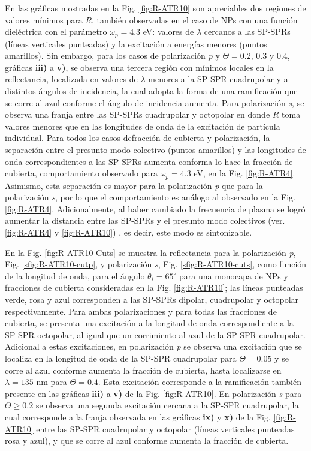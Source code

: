 	
En las gráficas mostradas en la Fig. \ref{fig:R-ATR10} son apreciables dos regiones de valores mínimos para $R$, también observadas en el caso de NPs con una función dieléctrica con el parámetro $\omega_p=4.3$ eV: valores de $\lambda$ cercanos a las SP-SPRs (líneas verticales punteadas) y la excitación a energías menores (puntos amarillos). Sin embargo, para los casos de polarización \emph{p} y $\Theta = 0.2,\,0.3$ y $0.4$, gráficas \textbf{iii)} a \textbf{v)}, se observa una tercera región con mínimos locales en la reflectancia, localizada en valores de $\lambda$ menores a la SP-SPR cuadrupolar y a distintos ángulos de incidencia, la cual adopta la forma de una ramificación que se corre al azul conforme el ángulo de incidencia aumenta. Para polarización \emph{s}, se observa una franja entre las SP-SPRs cuadrupolar y octopolar en donde $R$ toma valores menores que en las longitudes de onda de la excitación de partícula individual. Para todos los casos defracción de cubierta y polarización, la separación  entre el presunto modo colectivo (puntos amarillos) y las longitudes de onda correspondientes a las SP-SPRs aumenta conforma lo hace la fracción de cubierta, comportamiento observado para $\omega_p = 4.3$ eV, en la Fig.  \ref{fig:R-ATR4}.  Asimismo, esta separación es mayor para la polarización \emph{p} que para la polarización \emph{s}, por lo que el comportamiento es análogo al observado en la Fig. \ref{fig:R-ATR4}. Adicionalmente, al haber cambiado la frecuencia de plasma se logró aumentar la distancia entre las SP-SPRs y el presunto modo colectivos (ver. \ref{fig:R-ATR4} y \ref{fig:R-ATR10}) , es decir, este modo es sintonizable.

En la Fig. \ref{fig:R-ATR10-Cuts} se muestra la reflectancia para la polarización \emph{p}, Fig. \ref{sfig:R-ATR10-cutp}, y polarización \emph{s}, Fig. \ref{sfig:R-ATR10-cuts}, como función de la longitud de onda, para el ángulo $\theta_i = 65^\circ$ para una monocapa de NPs y fracciones de cubierta consideradas en la Fig. \ref{fig:R-ATR10}; las líneas punteadas verde, rosa y azul corresponden a las SP-SPRs dipolar, cuadrupolar y octopolar respectivamente. Para ambas polarizaciones y para todas las fracciones de cubierta, se presenta una excitación a la longitud de onda correspondiente a la SP-SPR octopolar, al igual que un corrimiento al azul de la SP-SPR cuadrupolar. Adicional a estas excitaciones, en polarización \emph{p} se observa una excitación que se localiza en la longitud de onda de la SP-SPR cuadrupolar para $\Theta=0.05$ y se corre al azul conforme aumenta la fracción de cubierta, hasta localizarse en $\lambda= 135$ nm para $\Theta=0.4$. Esta excitación corresponde a la ramificación también presente en las gráficas \textbf{iii)} a \textbf{v)} de la Fig. \ref{fig:R-ATR10}. En polarización \emph{s} para $\Theta\geq 0.2$ se observa una segunda excitación cercana a la SP-SPR cuadrupolar, la cual corresponde a la franja observada en las gráficas \textbf{ix)} y \textbf{x)} de la Fig. \ref{fig:R-ATR10} entre las SP-SPR cuadrupolar y octopolar (líneas verticales punteadas rosa y azul), y que se corre al azul conforme aumenta la fracción de cubierta.

